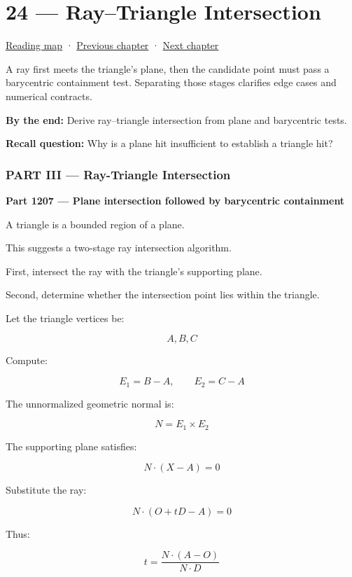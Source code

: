 \hypertarget{04-visual-computing-ii-ch024}{}
\section{24 --- Ray--Triangle Intersection}\label{raytriangle-intersection}

\href{Chapter\%20Edition/02\%20-\%20Graphics\%20Vision\%20and\%20XR/00\%20-\%20Reading\%20Map}{Reading map} · \hyperref[04-visual-computing-ii-ch023]{Previous chapter} · \hyperref[04-visual-computing-ii-ch025]{Next chapter}

A ray first meets the triangle's plane, then the candidate point must pass a barycentric containment test. Separating those stages clarifies edge cases and numerical contracts.

\textbf{By the end:} Derive ray--triangle intersection from plane and barycentric tests.

\textbf{Recall question:} Why is a plane hit insufficient to establish a triangle hit?

\subsubsection{PART III --- Ray-Triangle Intersection}\label{part-iii-ray-triangle-intersection}

\textbf{Part 1207 --- Plane intersection followed by barycentric containment}

A triangle is a bounded region of a plane.

This suggests a two-stage ray intersection algorithm.

First, intersect the ray with the triangle's supporting plane.

Second, determine whether the intersection point lies within the triangle.

Let the triangle vertices be:

\[
A,B,C
\]

Compute:

\[
E_1=B-A,\qquad E_2=C-A
\]

The unnormalized geometric normal is:

\[
N=E_1\times E_2
\]

The supporting plane satisfies:

\[
N\cdot(X-A)=0
\]

Substitute the ray:

\[
N\cdot(O+tD-A)=0
\]

Thus:

\[
\boxed{ t=\frac{N\cdot(A-O)}{N\cdot D} }
\]

